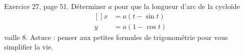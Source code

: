 \begin{exercice}\label{exoInter0013}

Exercice 27, page 51. Déterminer $a$ pour que la longueur d'arc de la cycloïde 
\begin{equation}
	\begin{aligned}[]
		x&=a(t-\sin t)\\
		y&=a(1-\cos t)
	\end{aligned}
\end{equation}
vaille $8$. Astuce : penser aux petites formules de trigonométrie pour vous simplifier la vie.

\end{exercice}
